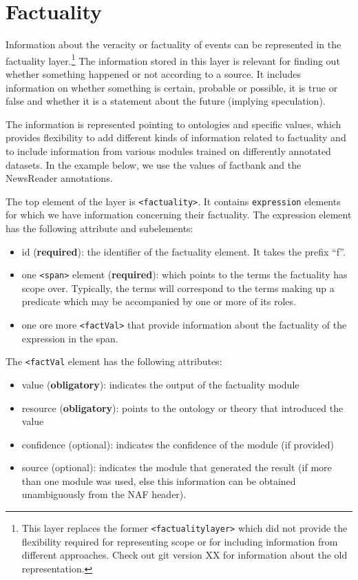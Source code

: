 \section{Factuality}
\label{sec:factuality}

Information about the veracity or factuality of events can be represented in the factuality layer.\footnote{This layer replaces the former {\tt<factualitylayer>} which did not provide the flexibility required for representing scope or for including information from different approaches. Check out git version XX for information about the old representation.} The information stored in this layer is relevant for finding out whether something happened or not according to a source. It includes information on whether something is certain, probable or possible, it is true or false and whether it is a statement about the future (implying speculation).

The  information is represented pointing to ontologies and specific values, which provides flexibility to add different kinds of information related to factuality and to include information from various modules trained on differently annotated datasets. In the example below, we use the values of factbank and the NewsReader annotations.

The top element of the layer is {\tt <factuality>}. It contains {\tt expression} elements for which we have information concerning their factuality. The expression element has the following attribute and subelements:

\begin{itemize}
\item id (\textbf{required}): the identifier of the factuality element. It takes the prefix ``f''.
\item one {\tt <span>} element (\textbf{required}): which points to the terms the factuality has scope over. Typically, the terms will correspond to the terms making up a predicate which may be accompanied by one or more of its roles. 
\item one ore more {\tt <factVal>} that provide information about the factuality of the expression in the span.
\end{itemize}

The {\tt <factVal} element has the following attributes:

\begin{itemize}
\item value (\textbf{obligatory}): indicates the output of the factuality module
\item resource (\textbf{obligatory}): points to the ontology or theory that introduced the value
\item confidence (optional): indicates the confidence of the module (if provided)
\item source (optional): indicates the module that generated the result (if more than one module was used, else this information can be obtained unambiguously from the NAF header).
\end{itemize}


